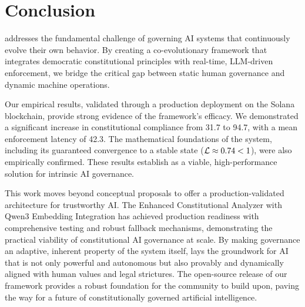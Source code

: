 \section{Conclusion}\label{sec:conclusion}
\acgs{} addresses the fundamental challenge of governing AI systems that continuously evolve their own behavior. By creating a co-evolutionary framework that integrates democratic constitutional principles with real-time, LLM-driven enforcement, we bridge the critical gap between static human governance and dynamic machine operations.

Our empirical results, validated through a production deployment on the Solana blockchain, provide strong evidence of the framework's efficacy. We demonstrated a significant increase in constitutional compliance from 31.7\percent{} to 94.7\percent{}, with a mean enforcement latency of 42.3\ms{}. The mathematical foundations of the system, including its guaranteed convergence to a stable state ($\lipschitz \approx 0.74 < 1$), were also empirically confirmed. These results establish \acgs{} as a viable, high-performance solution for intrinsic AI governance.

This work moves beyond conceptual proposals to offer a production-validated architecture for trustworthy AI\@. The Enhanced Constitutional Analyzer with Qwen3 Embedding Integration has achieved production readiness with comprehensive testing and robust fallback mechanisms, demonstrating the practical viability of constitutional AI governance at scale. By making governance an adaptive, inherent property of the system itself, \acgs{} lays the groundwork for AI that is not only powerful and autonomous but also provably and dynamically aligned with human values and legal strictures. The open-source release of our framework provides a robust foundation for the community to build upon, paving the way for a future of constitutionally governed artificial intelligence.
